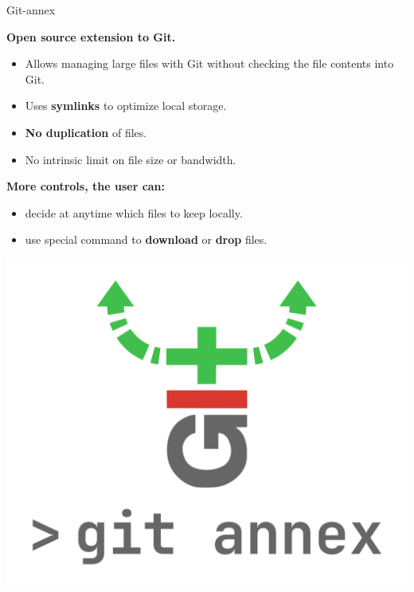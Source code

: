 \begin{frame}{Git-annex}
  \begin{minipage}{0.58\textwidth}
    \textbf{Open source extension to Git.}
    \begin{itemize}
      \item Allows managing large files with Git without checking the file contents into Git.
      \item Uses \textbf{symlinks} to optimize local storage.
      \item \textbf{No duplication} of files.
      \item No intrinsic limit on file size or bandwidth.
    \end{itemize}
    \vspace{0.5cm}
    \textbf{More controls, the user can:}
    \begin{itemize}
      \item decide at anytime which files to keep locally.
      \item use special command to \textbf{download} or \textbf{drop} files.
    \end{itemize}
  \end{minipage}%
  \hfill
  \begin{minipage}{0.38\textwidth}
    \centering
    \includegraphics[width=\linewidth]{images/git-annex-logo.png}
  \end{minipage}
\end{frame}

